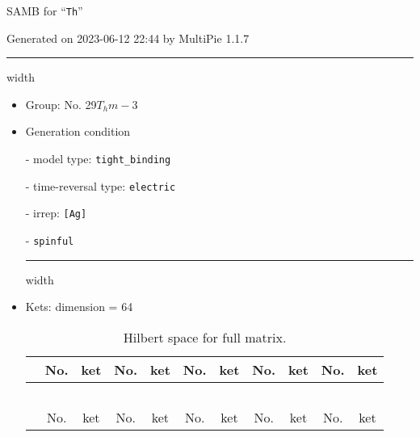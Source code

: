 \documentclass[fleqn,10pt,landscape]{article}
\begin{document}
\setcounter{MaxMatrixCols}{16}

\setlength{\baselineskip}{16pt}
\footnotesize
\begin{center}
\LARGE
SAMB for ``\texttt{Th}''
\end{center}
\begin{flushright}
Generated on 2023-06-12 22:44 by MultiPie 1.1.7
\end{flushright}
\vspace{1cm}


 \hfil \hrule height 1mm width \textwidth \hfil

\begin{itemize}
\item Group: No. 29\quad$T_{h}$\quad$m-3$\quad[ cubic ]

\vspace{5mm}

\item Generation condition

\quad - model type: \texttt{tight_binding}

\quad - time-reversal type: \texttt{electric}

\quad - irrep: \texttt{[Ag]}

\quad - \texttt{spinful}


 \hfil \hrule height 1mm width \textwidth \hfil

\item Kets: dimension = 64
\begin{center}
\renewcommand{\arraystretch}{1.3}
\begin{longtable}{c|cc|cc|cc|cc|cc}
\caption{Hilbert space for full matrix.}
 \\
 \hline \hline
 & No. & ket & No. & ket & No. & ket & No. & ket & No. & ket \\ \hline \endfirsthead

\multicolumn{10}{l}{\tablename\ \thetable{}} \\
 \hline \hline
 & No. & ket & No. & ket & No. & ket & No. & ket & No. & ket \\ \hline \endhead


\end{longtable}
\end{center}
\end{itemize}
\end{document}
